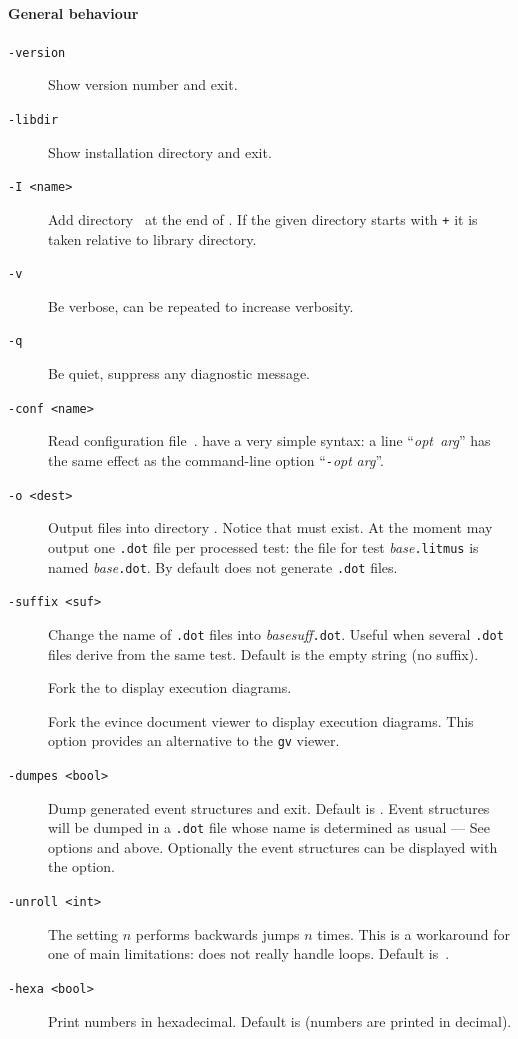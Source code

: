 \paragraph*{General behaviour}
\begin{description}
\item[{\tt -version}] Show version number and exit.
\item[{\tt -libdir}] Show installation directory and exit.
\item[{\tt -I <name>}] Add directory~ at the end of
 . If the given directory
starts with \texttt{+} it is taken relative to \herd{} library directory.
\item[{\tt -v}] Be verbose, can be repeated to increase verbosity.
\item[{\tt -q}] Be quiet, suppress any diagnostic message.
\item[{\tt -conf <name>}] Read configuration file~.
 have a very simple syntax:
a line ``\textit{opt}\texttt{  }\textit{arg}'' has the same effect as
the command-line option ``\texttt{-}\textit{opt} \textit{arg}''.
\item[{\tt -o <dest>}] Output files into directory .
Notice that  must exist.
At the moment \herd{} may output one \texttt{.dot} file per processed test:
the file for test \textit{base}\texttt{.litmus}
is named  \textit{base}\texttt{.dot}.
By default \herd{} does not generate \texttt{.dot} files.
\item[{\tt -suffix <suf>}] Change the name of \texttt{.dot} files
into \textit{base}\textit{suff}\texttt{.dot}. Useful when several \texttt{.dot} files derive from the same test. Default is the empty string (no suffix).
\item[{\tt {}}] Fork the  to display execution diagrams.
\item[{\tt {}}] Fork the evince document viewer to display execution diagrams. This option provides an alternative to the
{\tt gv} viewer.
\item[{\tt -dumpes <bool>}]
Dump generated event structures and exit. Default is .
Event structures will be dumped in a \texttt{.dot} file whose
name is determined as usual --- See options  and  above.
Optionally the event structures can be displayed with the  option.
\item[{\tt -unroll <int>}] The setting $n$ performs backwards
jumps $n$ times. This is a workaround for one of \herd{} main limitations:
\herd{} does not really handle loops. Default is~.
\item[{\tt -hexa <bool>}] Print numbers in hexadecimal. Default is 
(numbers are printed in decimal).
\end{description}

